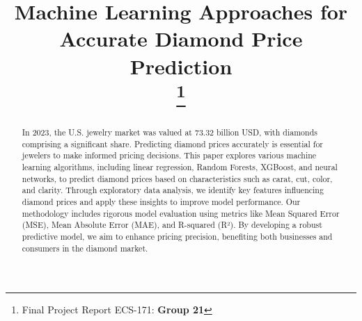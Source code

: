 \documentclass[conference]{IEEEtran}
\begin{document}
\title{Machine Learning Approaches for Accurate Diamond Price Prediction\\
\thanks{Final Project Report ECS-171: \textbf{Group 21}}
}

\author{
\and
{}
\and
{}
\and
{}
\and
{}
}

\maketitle

\begin{abstract}
In 2023, the U.S. jewelry market was valued at 73.32 billion USD, with diamonds comprising a significant share. Predicting diamond prices accurately is essential for jewelers to make informed pricing decisions. This paper explores various machine learning algorithms, including linear regression, Random Forests, XGBoost, and neural networks, to predict diamond prices based on characteristics such as carat, cut, color, and clarity. Through exploratory data analysis, we identify key features influencing diamond prices and apply these insights to improve model performance. Our methodology includes rigorous model evaluation using metrics like Mean Squared Error (MSE), Mean Absolute Error (MAE), and R-squared (R²). By developing a robust predictive model, we aim to enhance pricing precision, benefiting both businesses and consumers in the diamond market.
\end{abstract}
\end{document}
